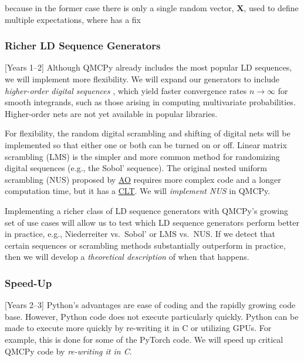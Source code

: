 \documentclass[11pt]{NSFamsart}
\newcommand{\AO}{\hyperlink{AOlink}{AO}\xspace}
\newcommand{\CLT}{\hyperlink{CLTlink}{CLT}\xspace}
\newcommand{\PyTorch}{PyTorch\xspace}
\newcommand{\bX}{{\boldsymbol{X}}}
\begin{document}
because in the former case there is only a single random vector, $\bX$, used to define multiple expectations, where  has a fix

\subsubsection{Richer LD Sequence Generators } [Years 1--2] \label{sec:richLD}
Although QMCPy already includes the most popular LD sequences, we will implement more flexibility.  We will expand our generators to include \emph{higher-order digital sequences} \cite{Dic09a, Dic11a}, which yield  faster convergence rates  $n \to \infty$ for smooth integrands, such as those arising in computing multivariate probabilities.  Higher-order nets are not yet available in popular libraries.

For flexibility, the random digital scrambling and shifting of digital nets will be implemented so that either one or both can be turned on or off.  Linear matrix scrambling (LMS) \cite{Mat98,HonHic00a} is the simpler and more common method for randomizing digital sequences (e.g., the Sobol' sequence).  The original nested uniform scrambling (NUS) proposed by \AO \cite{Owe95} requires more complex code and a longer computation time, but it has a \CLT  \cite{Loh01}.  We will \emph{implement NUS} in QMCPy.

Implementing a richer class of LD sequence generators with QMCPy's growing set of use cases will allow us to test which LD sequence generators perform better in practice, e.g., Niederreiter vs.\ Sobol' or LMS vs.\ NUS. If we detect that certain sequences or scrambling methods substantially outperform in practice, then we will develop a \emph{theoretical description} of when that happens.

\subsubsection{Speed-Up} [Years 2--3] \label{sec:speedup}
Python's advantages are ease of coding and the rapidly growing code base.  However, Python code does not execute particularly quickly.  Python can be made to execute more quickly by re-writing it in C or utilizing GPUs.  For example, this is done for some of the \PyTorch code.  We will speed up critical QMCPy code by \emph{re-writing it in C}.
\end{document}
